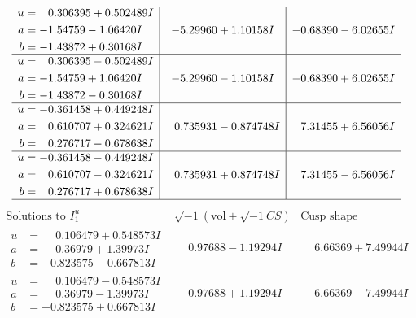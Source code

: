 \documentclass[1p]{elsarticle_modified}
\theoremstyle{definition}
\newcommand{\I}{\sqrt{-1}}
\begin{document}
$$\begin{array}{c|c|c}
\begin{aligned}
u &= \phantom{-}0.306395 + 0.502489 I \\
a &= -1.54759 - 1.06420 I \\
b &= -1.43872 + 0.30168 I\end{aligned}
 & -5.29960 + 1.10158 I & -0.68390 - 6.02655 I \\ \hline\begin{aligned}
u &= \phantom{-}0.306395 - 0.502489 I \\
a &= -1.54759 + 1.06420 I \\
b &= -1.43872 - 0.30168 I\end{aligned}
 & -5.29960 - 1.10158 I & -0.68390 + 6.02655 I \\ \hline\begin{aligned}
u &= -0.361458 + 0.449248 I \\
a &= \phantom{-}0.610707 + 0.324621 I \\
b &= \phantom{-}0.276717 - 0.678638 I\end{aligned}
 & \phantom{-}0.735931 - 0.874748 I & \phantom{-}7.31455 + 6.56056 I \\ \hline\begin{aligned}
u &= -0.361458 - 0.449248 I \\
a &= \phantom{-}0.610707 - 0.324621 I \\
b &= \phantom{-}0.276717 + 0.678638 I\end{aligned}
 & \phantom{-}0.735931 + 0.874748 I & \phantom{-}7.31455 - 6.56056 I\\
 \hline 
 \end{array}$$\newpage$$\begin{array}{c|c|c}  
\text{Solutions to }I^u_{1}& \I (\text{vol} + \sqrt{-1}CS) & \text{Cusp shape}\\
 \hline 
\begin{aligned}
u &= \phantom{-}0.106479 + 0.548573 I \\
a &= \phantom{-}0.36979 + 1.39973 I \\
b &= -0.823575 - 0.667813 I\end{aligned}
 & \phantom{-}0.97688 - 1.19294 I & \phantom{-}6.66369 + 7.49944 I \\ \hline\begin{aligned}
u &= \phantom{-}0.106479 - 0.548573 I \\
a &= \phantom{-}0.36979 - 1.39973 I \\
b &= -0.823575 + 0.667813 I\end{aligned}
 & \phantom{-}0.97688 + 1.19294 I & \phantom{-}6.66369 - 7.49944 I \\ \hline\begin{aligned}

\end{aligned}
\end{array}$$
\end{document}
